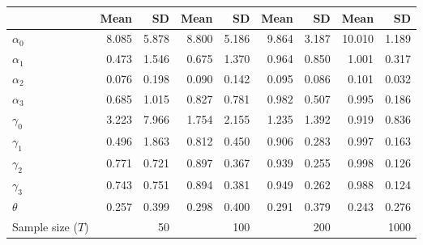 
\begin{tabular}[t]{lrrrrrrrr}
\toprule
  & Mean & SD & Mean  & SD  & Mean   & SD   & Mean    & SD   \\
\midrule
$\alpha_{0}$ & 8.085 & 5.878 & 8.800 & 5.186 & 9.864 & 3.187 & 10.010 & 1.189\\
$\alpha_{1}$ & 0.473 & 1.546 & 0.675 & 1.370 & 0.964 & 0.850 & 1.001 & 0.317\\
$\alpha_{2}$ & 0.076 & 0.198 & 0.090 & 0.142 & 0.095 & 0.086 & 0.101 & 0.032\\
$\alpha_{3}$ & 0.685 & 1.015 & 0.827 & 0.781 & 0.982 & 0.507 & 0.995 & 0.186\\
$\gamma_{0}$ & 3.223 & 7.966 & 1.754 & 2.155 & 1.235 & 1.392 & 0.919 & 0.836\\
$\gamma_{1}$ & 0.496 & 1.863 & 0.812 & 0.450 & 0.906 & 0.283 & 0.997 & 0.163\\
$\gamma_{2}$ & 0.771 & 0.721 & 0.897 & 0.367 & 0.939 & 0.255 & 0.998 & 0.126\\
$\gamma_{3}$ & 0.743 & 0.751 & 0.894 & 0.381 & 0.949 & 0.262 & 0.988 & 0.124\\
$\theta$ & 0.257 & 0.399 & 0.298 & 0.400 & 0.291 & 0.379 & 0.243 & 0.276\\
Sample size ($T$) &  & 50 &  & 100 &  & 200 &  & 1000\\
\bottomrule
\end{tabular}
